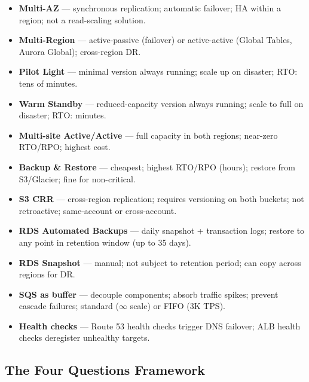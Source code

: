 \begin{keyfacts}
\begin{itemize}
  \item \textbf{Multi-AZ} --- synchronous replication; automatic failover; HA within a region; not a read-scaling solution.
  \item \textbf{Multi-Region} --- active-passive (failover) or active-active (Global Tables, Aurora Global); cross-region DR.
  \item \textbf{Pilot Light} --- minimal version always running; scale up on disaster; RTO: tens of minutes.
  \item \textbf{Warm Standby} --- reduced-capacity version always running; scale to full on disaster; RTO: minutes.
  \item \textbf{Multi-site Active/Active} --- full capacity in both regions; near-zero RTO/RPO; highest cost.
  \item \textbf{Backup \& Restore} --- cheapest; highest RTO/RPO (hours); restore from S3/Glacier; fine for non-critical.
  \item \textbf{S3 CRR} --- cross-region replication; requires versioning on both buckets; not retroactive; same-account or cross-account.
  \item \textbf{RDS Automated Backups} --- daily snapshot + transaction logs; restore to any point in retention window (up to 35 days).
  \item \textbf{RDS Snapshot} --- manual; not subject to retention period; can copy across regions for DR.
  \item \textbf{SQS as buffer} --- decouple components; absorb traffic spikes; prevent cascade failures; standard ($\infty$ scale) or FIFO (3K TPS).
  \item \textbf{Health checks} --- Route 53 health checks trigger DNS failover; ALB health checks deregister unhealthy targets.
\end{itemize}
\end{keyfacts}

\subsection{The Four Questions Framework}

